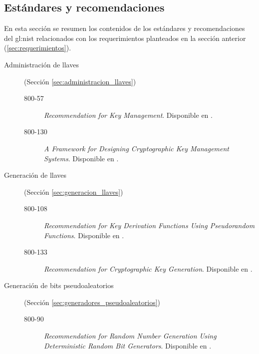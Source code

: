 %
%

\subsection{Estándares y recomendaciones}
\label{sec:estandares}

En esta sección se resumen los contenidos de los estándares y recomendaciones
del \gls{gl:nist} relacionados con los requerimientos planteados en la
sección anterior (\ref{sec:requerimientos}).

\begin{description}

  \item[Administración de llaves] (Sección \ref{sec:administracion_llaves})
    \begin{description}
      \item[800-57] \textit{Recommendation for Key Management}. Disponible en
        \cite{nist_llaves}.
      \item[800-130] \textit{A Framework for Designing Cryptographic Key
        Management Systems}. Disponible en \cite{nist_disenio_llaves}.
    \end{description}

  \item[Generación de llaves] (Sección \ref{sec:generacion_llaves})
    \begin{description}
      \item[800-108] \textit{Recommendation for Key Derivation Functions Using
        Pseudorandom Functions}. Disponible en \cite{nist_derivacion_llaves}.
      \item[800-133] \textit{Recommendation for Cryptographic Key Generation}.
        Disponible en \cite{nist_creacion_llaves}.
    \end{description}

  \item[Generación de bits pseudoaleatorios] (Sección
    \ref{sec:generadores_pseudoaleatorios})
    \begin{description}
      \item[800-90] \textit{Recommendation for Random Number Generation Using
        Deterministic Random Bit Generators}. Disponible en
        \cite{nist_aleatorios}.
    \end{description}
\end{description}




